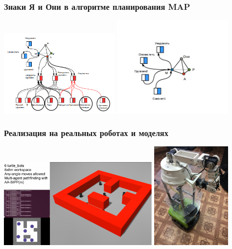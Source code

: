 \documentclass[default]{beamer}
\begin{document}
	\begin{frame}
		\frametitle{Знаки Я и Они в алгоритме планирования MAP}
		
		\begin{center}
			\includegraphics[width=0.45\textwidth]{I-sign.png}
			\includegraphics[width=0.45\textwidth]{they-sign.png}
		\end{center}
		\nocite{*}
		\printbibliography[keyword={roledistrib}, resetnumbers=true]
	\end{frame}

	\begin{frame}
		\frametitle{Реализация на реальных роботах и моделях}
		
		\begin{center}
			\includegraphics[width=0.6\textwidth]{gazebo.png}
			\quad\quad
			\includegraphics[width=0.3\textwidth]{nexus.png}
		\end{center}
	\end{frame}
	
\end{document}
